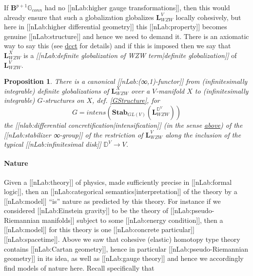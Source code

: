 \documentclass[12pt,titlepage]{article}
\theoremstyle{plain}
\newtheorem{prop}{Proposition}
\theoremstyle{definition}
\theoremstyle{remark}
\begin{document}
If $\mathbf{B}^{p+1}\mathbb{G}_{conn}$ had no [[nLab:higher gauge transformations]], then this would already ensure that such a globalization globalizes $\mathbf{L}_{WZW}^V$ locally cohesively, but here in [[nLab:higher differential geometry]] this [[nLab:property]] becomes genuine [[nLab:structure]] and hence we need to demand it. There is an axiomatic way to say this (see \hyperlink{dcct}{dcct} for details) and if this is imposed then we say that $\mathbf{L}_{WZW}^X$ is a \emph{[[nLab:definite globalization of WZW term|definite globalization]]} of $\mathbf{L}_{WZW}^V$.
\begin{prop}
\label{DefiniteGlobalizationsToGStructure}\hypertarget{DefiniteGlobalizationsToGStructure}{}
There is a canonical [[nLab:(∞,1)-functor]] from (infinitesimally integrable) definite globalizations of $\mathbf{L}_{WZW}^X$ over a $V$-manifold $X$ to (infinitesimally integrable) $G$-structures on $X$, def. \ref{GStructure}, for
\begin{displaymath}
G = intens(\mathbf{Stab}_{GL(V)}(\mathbf{L}_{WZW}^{\mathbb{D}^V}))
\end{displaymath}
the [[nlab:differential concretification|intensification]] (in the sense \hyperlink{IntensiveExtensive}{above}) of the [[nLab:stabilizer ∞-group]] of the restriction of $\mathbf{L}_{WZW}^V$ along the inclusion of the typical [[nLab:infinitesimal disk]] $\mathbb{D}^V \to V$.
\end{prop}
\hypertarget{nature}{}\paragraph*{{Nature}}\label{nature}
Given a [[nLab:theory]] of physics, made sufficiently precise in [[nLab:formal logic]], then an [[nLab:categorical semantics|interpretation]] of the theory by a [[nLab:model]] ``is'' nature as predicted by this theory.
For instance if we considered [[nLab:Einstein gravity]] to be the theory of [[nLab:pseudo-Riemannian manifolds]] subject to some [[nLab:energy condition]], then a [[nLab:model]] for this theory is one [[nLab:concrete particular]] [[nLab:spacetime]].
Above we saw that cohesive (elastic) homotopy type theory contains [[nLab:Cartan geometry]], hence in particular [[nLab:pseudo-Riemannian geometry]] in its idea, as well as [[nLab:gauge theory]] and hence we accordingly find models of nature here.
Recall specifically that
\end{document}
